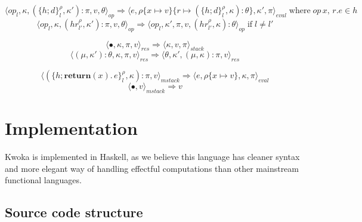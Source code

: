 \documentclass[a4paper]{article}
\begin{document}
$$\langle \mathit{op}_l, \kappa, (\mathit{\{h;d\}}_l^\rho, \kappa') : \pi, v, \theta \rangle_\mathit{op} \Rightarrow
   \langle e, \rho\{x \mapsto v\}\{r \mapsto (\mathit{\{h;d\}}_l^\rho, \kappa) : \theta\}, \kappa', \pi \rangle_\mathit{eval}
   \; \text{where} \; op \, x,\, r.e \in h$$
$$\langle \mathit{op}_l, \kappa, (\mathit{hr}_{l'}^\rho, \kappa') : \pi, v, \theta \rangle_\mathit{op} \Rightarrow
  \langle \mathit{op}_l, \kappa', \pi, v, (\mathit{hr}_{l'}^\rho, \kappa) : \theta \rangle_\mathit{op}
   \; \text{if} \; l \neq l'$$

$$\langle \bullet, \kappa, \pi, v \rangle_\mathit{res} \Rightarrow
  \langle \kappa, v, \pi \rangle_\mathit{stack}$$
$$\langle (\mu, \kappa') : \theta, \kappa, \pi, v \rangle_\mathit{res} \Rightarrow
  \langle \theta, \kappa', (\mu, \kappa) : \pi, v \rangle_\mathit{res}$$

$$ \langle (\{h; \mathbf{return}(x).\,e\}_l^\rho, \kappa) : \pi, v \rangle_\mathit{mstack} \Rightarrow
   \langle e, \rho\{x \mapsto v\}, \kappa, \pi \rangle_\mathit{eval}$$
$$ \langle \bullet, v \rangle_\mathit{mstack} \Rightarrow v$$

\section{Implementation}
Kwoka is implemented in Haskell, as we believe this language has cleaner syntax and
more elegant way of handling effectful computations than other mainstream functional languages.
\subsection*{Source code structure}
\end{document}
